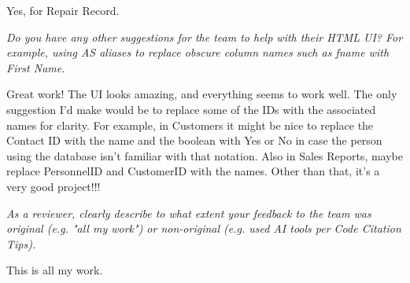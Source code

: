 \documentclass{article}
\begin{document}
\begin{tcolorbox}[colback=secondarycolor, colframe=primarycolor, title=\textbf{Step 3: Peer Review 1 - Scott Dispensa}]
\vspace{0.05cm}
Yes, for Repair Record.

\vspace{0.2cm}
\textit{Do you have any other suggestions for the team to help with their HTML UI? For example, using AS aliases to replace obscure column names such as fname with First Name.}

\vspace{0.05cm}
Great work! The UI looks amazing, and everything seems to work well. The only suggestion I'd make would be to replace some of the IDs with the associated names for clarity. For example, in Customers it might be nice to replace the Contact ID with the name and the boolean with Yes or No in case the person using the database isn't familiar with that notation. Also in Sales Reports, maybe replace PersonnelID and CustomerID with the names. Other than that, it's a very good project!!!

\vspace{0.2cm}
\textit{As a reviewer, clearly describe to what extent your feedback to the team was original (e.g. "all my work") or non-original (e.g. used AI tools per Code Citation Tips). }

\vspace{0.05cm}
This is all my work.

\end{tcolorbox}

\vspace{0.2cm}
\end{document}
